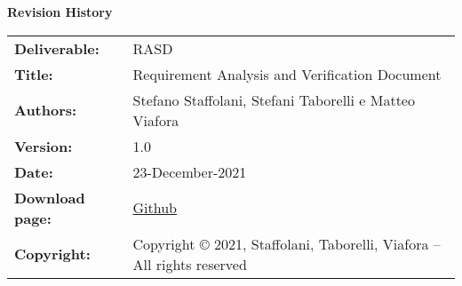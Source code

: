 \textbf{Revision History}
\begin{table}[h!]
\begin{tabu} to \textwidth { X[0.3,r,p] X[0.7,l,p] }
\hline

\textbf{Deliverable:} & RASD\\
\textbf{Title:} & Requirement Analysis and Verification Document \\
\textbf{Authors:} & Stefano Staffolani, Stefani Taborelli e Matteo Viafora \\
\textbf{Version:} & 1.0 \\ 
\textbf{Date:} & 23-December-2021 \\
\textbf{Download page:} & \href{https://github.com/ViaforaMatteo/StaffolaniTaborelliViafora}{Github} \\
\textbf{Copyright:} & Copyright © 2021, Staffolani, Taborelli, Viafora – All rights reserved \\
\hline
\end{tabu}
\end{table}